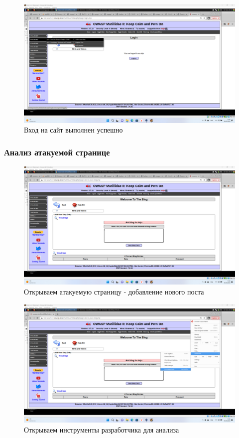\documentclass[a4paper]{article}
\begin{document}
  \begin{figure}[H]
    \centering
    \includegraphics[width=\textwidth]{Screenshot_22}
    \caption{Вход на сайт выполнен успешно}
  \end{figure}

  \subsubsection{Анализ атакуемой странице}

  \begin{figure}[H]
    \centering
    \includegraphics[width=\textwidth]{Screenshot_23}
    \caption{Открываем атакуемую страницу - добавление нового поста}
  \end{figure}

  \begin{figure}[H]
    \centering
    \includegraphics[width=\textwidth]{Screenshot_24}
    \caption{Открываем инструменты разработчика для анализа}
  \end{figure}
\end{document}

